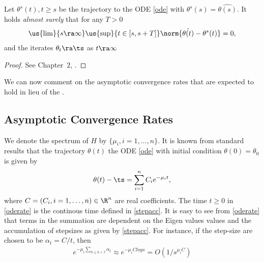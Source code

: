 \begin{theorem}\label{sadim}
Let $\theta^s(t), t\geq s$ be the trajectory to the ODE \eqref{ode} with $\theta^s(s)=\hat{\theta(s)}$. It holds \emph{almost surely} that for any $T>0$
\begin{align}
\us{\lim}{s\ra\infty} \us{\sup}{t\in[s,s+T]}\norm{\hat{\theta(t)}- \theta^s(t)} = 0,
\end{align}
and the iterates $\theta_t \ra \ts$ as $t\ra\infty$
\end{theorem}
\begin{proof}
See Chapter~$2$, \cite{SA}.
\end{proof}
We can now comment on the asymptotic convergence rates that are expected to hold in lieu of the .
\subsection{Asymptotic Convergence Rates}\label{initial}
We denote the spectrum of $H$ by $\{\mu_i,i=1,\ldots,n\}$. It is known from standard results that the trajectory $\theta(t)$ the ODE \eqref{ode} with initial condition $\theta(0)=\theta_0$ is given by
\begin{align}\label{oderate}
\theta(t)-\ts=\sum_{i=1}^n C_i e^{-\mu_i t},
\end{align}
where $C=(C_i,i=1,\ldots,n)\in \R^n$ are real coefficients. The time $t\geq 0$ in \eqref{oderate} is the continous time defined in \eqref{stepacc}. It is easy to see from \eqref{oderate} that terms in the summation are dependent on the Eigen values values and the accumulation of stepsizes as given by \eqref{stepacc}. For instance, if the step-size are chosen to be $\alpha_t=C/t$, then
\begin{align}\label{biasforget}e^{-\mu_i\sum_{0\leq k<t}\alpha_t}\approx e^{-\mu_i Clog s}=O(1/s^{\mu_i C})\end{align}
